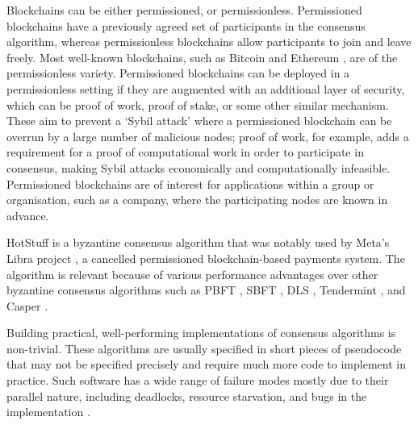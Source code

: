 Blockchains can be either permissioned, or permissionless. Permissioned blockchains have a previously agreed set of participants in the consensus algorithm, whereas permissionless blockchains allow participants to join and leave freely. Most well-known blockchains, such as Bitcoin \cite{nakamoto_bitcoin_nodate} and Ethereum \cite{wood_ethereum_nodate}, are of the permissionless variety. Permissioned blockchains can be deployed in a permissionless setting if they are augmented with an additional layer of security, which can be proof of work, proof of stake, or some other similar mechanism. These aim to prevent a `Sybil attack' where a permissioned blockchain can be overrun by a large number of malicious nodes; proof of work, for example, adds a requirement for a proof of computational work in order to participate in consensus, making Sybil attacks economically and computationally infeasible. Permissioned blockchains are of interest for applications within a group or organisation, such as a company, where the participating nodes are known in advance.

HotStuff is a byzantine consensus algorithm that was notably used by Meta's Libra project \cite{baudet_state_nodate}, a cancelled permissioned blockchain-based payments system. The algorithm is relevant because of various performance advantages over other byzantine consensus algorithms such as PBFT \cite{castro_practical_nodate}, SBFT \cite{golan_gueta_sbft_2019}, DLS \cite{dwork_consensus_nodate}, Tendermint \cite{kwon_tendermint_nodate}, and Casper \cite{buterin_casper_2019}.


Building practical, well-performing implementations of consensus algorithms is non-trivial. These algorithms are usually specified in short pieces of pseudocode that may not be specified precisely and require much more code to implement in practice. Such software has a wide range of failure modes mostly due to their parallel nature, including deadlocks, resource starvation, and bugs in the implementation \cite{chubby}.

